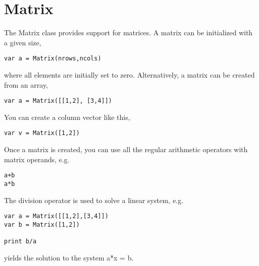 \hypertarget{matrix}{%
\section{Matrix}\label{matrix}}

The Matrix class provides support for matrices. A matrix can be
initialized with a given size,

\begin{lstlisting}
var a = Matrix(nrows,ncols)
\end{lstlisting}

where all elements are initially set to zero. Alternatively, a matrix
can be created from an array,

\begin{lstlisting}
var a = Matrix([[1,2], [3,4]])
\end{lstlisting}

You can create a column vector like this,

\begin{lstlisting}
var v = Matrix([1,2])
\end{lstlisting}

Once a matrix is created, you can use all the regular arithmetic
operators with matrix operands, e.g.

\begin{lstlisting}
a+b
a*b
\end{lstlisting}

The division operator is used to solve a linear system, e.g.

\begin{lstlisting}
var a = Matrix([[1,2],[3,4]])
var b = Matrix([1,2])

print b/a
\end{lstlisting}

yields the solution to the system a*x = b.

